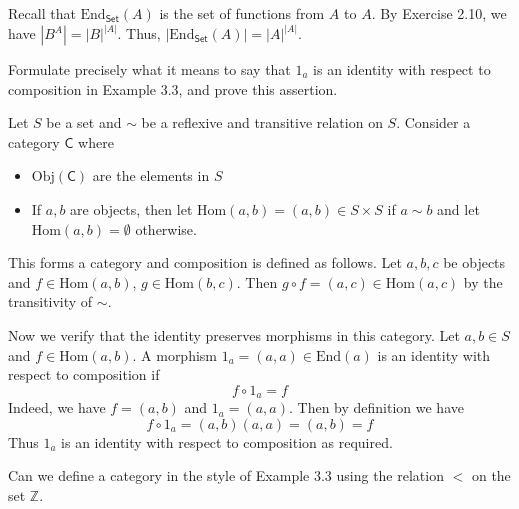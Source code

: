 \documentclass[../../master.tex]{subfiles}
\begin{document}
  \begin{solution}
    Recall that \(\text{End}_{\mathsf{Set}}(A)\) is the set of functions from \(A\) to \(A\).
    By Exercise 2.10, we have \(|B^{A}| = |B|^{|A|}\).
    Thus, \(|\text{End}_{\mathsf{Set}}(A)| = |A|^{|A|}\).
  \end{solution}

  \begin{problem}
    Formulate precisely what it means to say that \(1_{a}\) is an identity with respect to composition in Example 3.3, and prove this assertion.
  \end{problem}

  \begin{solution}
    Let \(S\) be a set and \(\sim\) be a reflexive and transitive relation on \(S\).
    Consider a category \(\mathsf{C}\) where
    \begin{itemize}
      \item \(\text{Obj}(\mathsf{C})\) are the elements in \(S\)
      \item If \(a, b\) are objects, then let \(\text{Hom}(a, b) = (a, b) \in S \times S\) if \(a \sim b\) and let \(\text{Hom}(a, b) = \emptyset\) otherwise.
    \end{itemize}
    This forms a category and composition is defined as follows. Let \(a, b, c\) be objects and \(f \in \text{Hom}(a, b)\), \(g \in \text{Hom}(b, c)\).
    Then \(g \circ f = (a, c) \in \text{Hom}(a, c)\) by the transitivity of \(\sim\).

    Now we verify that the identity preserves morphisms in this category.
    Let \(a, b \in S\) and \(f \in \text{Hom}(a, b)\).
    A morphism \(1_{a} = (a, a) \in \text{End}(a)\) is an identity with respect to composition if
    \begin{equation*}
      f \circ 1_{a} = f
    \end{equation*}
    Indeed, we have \(f = (a, b)\) and \(1_{a} = (a, a)\).
    Then by definition we have
    \begin{equation*}
      f \circ 1_{a} = (a, b) (a, a) = (a, b) = f
    \end{equation*}
    Thus \(1_{a}\) is an identity with respect to composition as required.
  \end{solution}

  \begin{problem}
    Can we define a category in the style of Example 3.3 using the relation \(<\) on the set \(\mathbb{Z}\).
  \end{problem}
\end{document}
